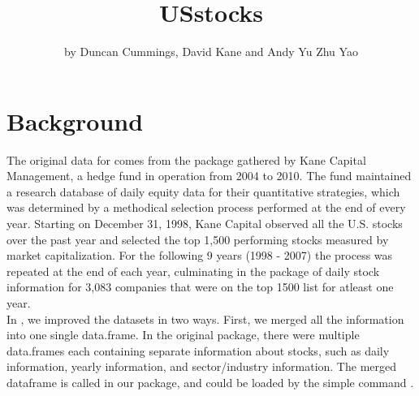 \title{USstocks}
\author{by Duncan Cummings, David Kane and Andy Yu Zhu Yao}

\maketitle


\section{Background} 

The original data for  comes from the  package gathered by Kane Capital Management, a hedge fund in operation from 2004 to 2010. The fund maintained a research database of daily equity data for their quantitative strategies, which was determined by a methodical selection process performed at the end of every year. Starting on December 31, 1998, Kane Capital observed all the U.S. stocks over the past year and selected the top 1,500 performing stocks measured by market capitalization. For the following 9 years (1998 - 2007) the process was repeated at the end of each year, culminating in the  package of daily stock information for 3,083 companies that were on the top 1500 list for atleast one year. \\

In , we improved the  datasets in two ways. First, we merged all the information into one single data.frame. In the original package, there were multiple data.frames each containing separate information about stocks, such as daily information, yearly information, and sector/industry information. The merged dataframe is called  in our  package, and could be loaded by the simple command . \\

